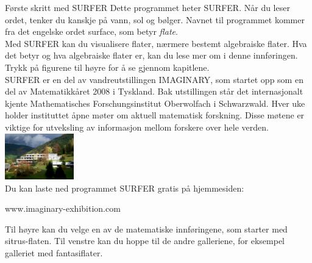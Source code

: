 \begin{surferIntroPage}{Første skritt med SURFER}
 Dette programmet heter SURFER. Når du leser ordet, tenker du kanskje på vann, sol og bølger. 
 Navnet til programmet kommer fra det engelske ordet surface, som betyr {\it flate}. 
\\
Med SURFER kan du visualisere flater, nærmere bestemt algebraiske flater. Hva det betyr og 
hva algebraiske flater er, kan du lese mer om i denne innføringen. Trykk på figurene til 
høyre for å se gjennom kapitlene.\\

SURFER er en del av vandreutstillingen IMAGINARY, som startet opp som en del av Matematikkåret
 2008 i Tyskland. Bak utstillingen står det internasjonalt kjente Mathematisches Forschungsinstitut 
 Oberwolfach i Schwarzwald. Hver uke holder instituttet åpne møter om aktuell matematisk forskning.
 Disse møtene er viktige for utveksling av informasjon mellom forskere over hele verden.\\
 
\vspace{0.2cm} \hspace{3.5cm}\includegraphics[width=3cm]{./../../common/images/photo_mfo.jpg}\\
Du kan laste ned programmet SURFER gratis på hjemmesiden: \\
\begin{centering}
www.imaginary-exhibition.com\\
\end{centering}
 \vspace{0.2cm}
Til høyre kan du velge en av de matematiske innføringene, som starter med sitrus-flaten.
 Til venstre kan du hoppe til de andre galleriene, for eksempel galleriet med fantasiflater.
\end{surferIntroPage}
